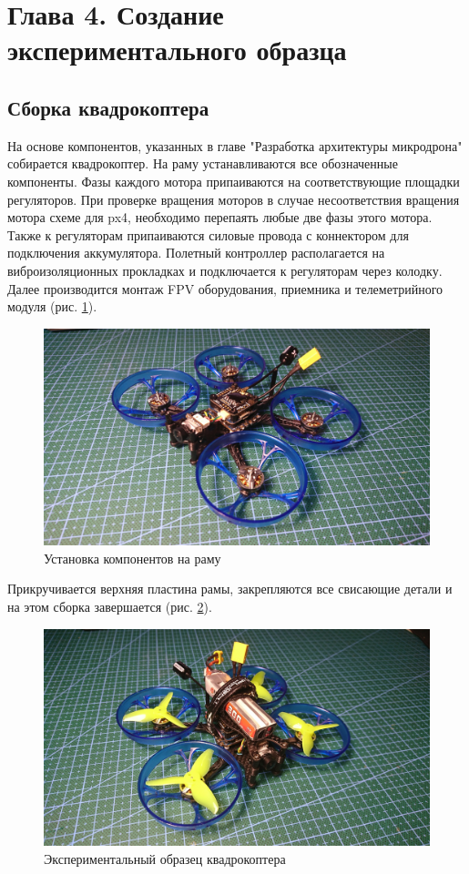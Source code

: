 
\section{Глава 4. Создание экспериментального образца}

\subsection{Сборка квадрокоптера}
На основе компонентов, указанных в главе "Разработка архитектуры микродрона" собирается квадрокоптер. На раму устанавливаются все обозначенные компоненты. Фазы каждого мотора припаиваются на соответствующие площадки регуляторов. При проверке вращения моторов в случае несоответствия вращения мотора схеме для px4, необходимо перепаять любые две фазы этого мотора. Также к регуляторам припаиваются силовые провода с коннектором для подключения аккумулятора. Полетный контроллер располагается на виброизоляционных прокладках и подключается к регуляторам через колодку. Далее производится монтаж FPV оборудования, приемника и телеметрийного модуля (рис. \ref{fig:quad1}).
\begin{figure}[H]
	\centering
	\includegraphics[width=0.5\linewidth]{../RW/pics/quad1}
	\caption{Установка компонентов на раму
	}
	\label{fig:quad1}
\end{figure}
Прикручивается верхняя пластина рамы, закрепляются все свисающие детали и на этом сборка завершается (рис. \ref{fig:quad2}).
\begin{figure}[H]
	\centering
	\includegraphics[width=0.5\linewidth]{../RW/pics/quad2}
	\caption{Экспериментальный образец квадрокоптера
	}
	\label{fig:quad2}
\end{figure}

